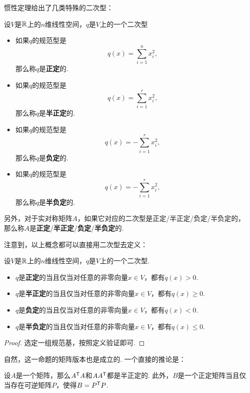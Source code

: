 惯性定理给出了几类特殊的二次型：

\begin{definition}\label{def:positive-definite}
    设$V$是$\mathbb{R}$上的$n$维线性空间，$q$是$V$上的一个二次型
    \begin{itemize}
        \item 如果$q$的规范型是
        \[
            q(x)=\sum_{i=1}^n x_i^2,
        \]
        那么称$q$是\textbf{正定}的. 
        \item 如果$q$的规范型是
        \[
            q(x)=\sum_{i=1}^r x_i^2,
        \]
        那么称$q$是\textbf{半正定}的. 
        \item 如果$q$的规范型是
        \[
            q(x)=-\sum_{i=1}^r x_i^2,
        \]
        那么称$q$是\textbf{负定}的. 
        \item 如果$q$的规范型是
        \[
            q(x)=-\sum_{i=1}^r x_i^2,
        \]
        那么称$q$是\textbf{半负定}的. 
    \end{itemize}
另外，对于实对称矩阵$A$，如果它对应的二次型是正定/半正定/负定/半负定的，那么称$A$是\textbf{正定}/\textbf{半正定}/\textbf{负定}/\textbf{半负定}的. 
\end{definition}
注意到，以上概念都可以直接用二次型去定义：
\begin{proposition}\label{prop:positive-definite}
    设$V$是$\mathbb{R}$上的$n$维线性空间，$q$是$V$上的一个二次型. 
    \begin{itemize}
        \item $q$是\textbf{正定}的当且仅当对任意的非零向量$x\in V$，都有$q(x)>0$. 
        \item $q$是\textbf{半正定}的当且仅当对任意的非零向量$x\in V$，都有$q(x)\geq 0$. 
        \item $q$是\textbf{负定}的当且仅当对任意的非零向量$x\in V$，都有$q(x)<0$. 
        \item $q$是\textbf{半负定}的当且仅当对任意的非零向量$x\in V$，都有$q(x)\leq 0$. 
    \end{itemize}
\end{proposition}
\begin{proof}
    选定一组规范基，按照定义验证即可. 
\end{proof}

自然，这一命题的矩阵版本也是成立的. 一个直接的推论是：

\begin{corollary}\label{cor:positive-definite}
设$A$是一个矩阵，那么$A^{\mathsf{T}} A$和$AA^{\mathsf{T}}$都是半正定的. 此外，$B$是一个正定矩阵当且仅当存在可逆矩阵$P$，使得$B=P^{\mathsf{T}} P$.
\end{corollary}

